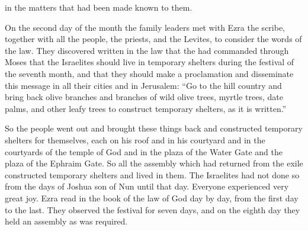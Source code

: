 {in the matters
that had
been made known to them.
\par }{\PP {}On the second
day
of the month the family leaders
met with Ezra
the scribe,
together
with all
the people,
the priests,
and the Levites,
to
consider
the words
of the law.
They discovered
written
in the law
that
the
{}
had commanded
through
Moses
that
the Israelites
should live
in temporary shelters
during the festival
of the seventh
month,
and that
they should make a proclamation
and disseminate
this message
in all
their cities
and in Jerusalem: “Go
to the hill country
and bring back
olive
branches
and branches
of wild olive
trees,
myrtle trees,
date palms,
and other leafy
trees
to construct
temporary shelters,
as it is written.”
\par }{\PP {}So
the people
went out
and brought
these things back and constructed
temporary shelters
for themselves, each
on
his roof
and in his courtyard
and in the courtyards
of the temple
of God
and in the plaza
of the Water
Gate
and the plaza
of the Ephraim
Gate.
So
all
the assembly
which had returned
from
the exile
constructed temporary shelters
and lived
in them. The Israelites
had
not
done
so from the days
of Joshua
son
of Nun
until
that
day.
Everyone experienced very
great
joy.
Ezra read
in the book
of the law
of God
day
by day,
from
the first
day
to the last.
They observed
the festival
for seven
days,
and on
the eighth
day
they held an assembly
as was required.

}
